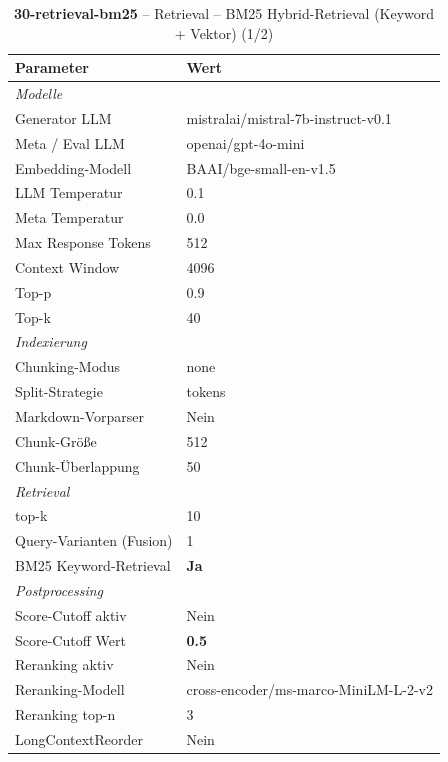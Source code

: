 \begin{table}[H]
\centering
\small
\setlength{\tabcolsep}{4pt}
\begin{tabular}{lp{8cm}}
\toprule
\textbf{Parameter} & \textbf{Wert} \\
\midrule
\multicolumn{2}{l}{\textit{Modelle}} \\
\midrule
\quad Generator LLM & mistralai/mistral-7b-instruct-v0.1 \\
\quad Meta / Eval LLM & openai/gpt-4o-mini \\
\quad Embedding-Modell & BAAI/bge-small-en-v1.5 \\
\quad LLM Temperatur & 0.1 \\
\quad Meta Temperatur & 0.0 \\
\quad Max Response Tokens & 512 \\
\quad Context Window & 4096 \\
\quad Top-p & 0.9 \\
\quad Top-k & 40 \\
\midrule
\multicolumn{2}{l}{\textit{Indexierung}} \\
\midrule
\quad Chunking-Modus & none \\
\quad Split-Strategie & tokens \\
\quad Markdown-Vorparser & Nein \\
\quad Chunk-Größe & 512 \\
\quad Chunk-Überlappung & 50 \\
\midrule
\multicolumn{2}{l}{\textit{Retrieval}} \\
\midrule
\quad top-k & 10 \\
\quad Query-Varianten (Fusion) & 1 \\
\quad BM25 Keyword-Retrieval & \textbf{Ja} \\
\midrule
\multicolumn{2}{l}{\textit{Postprocessing}} \\
\midrule
\quad Score-Cutoff aktiv & Nein \\
\quad Score-Cutoff Wert & \textbf{0.5} \\
\quad Reranking aktiv & Nein \\
\quad Reranking-Modell & cross-encoder/ms-marco-MiniLM-L-2-v2 \\
\quad Reranking top-n & 3 \\
\quad LongContextReorder & Nein \\
\bottomrule
\end{tabular}
\caption{\textbf{30-retrieval-bm25} -- Retrieval -- BM25 Hybrid-Retrieval (Keyword + Vektor) (1/2)}
\label{tab:config_30_retrieval_bm25_a}
\end{table}


